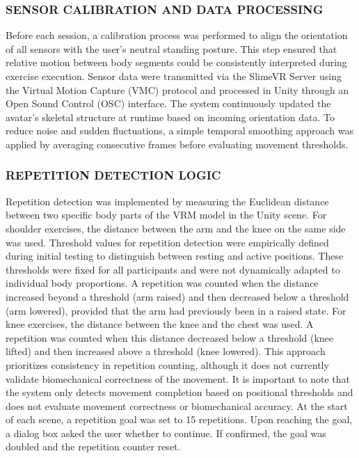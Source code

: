 \documentclass[a4paper,twoside]{article}
\begin{document}
\subsubsection{\uppercase{Sensor Calibration and Data Processing}}
Before each session, a calibration process was performed to align the orientation of all sensors with the user’s neutral standing posture. This step ensured that relative motion between body segments could be consistently interpreted during exercise execution.
Sensor data were transmitted via the SlimeVR Server using the Virtual Motion Capture (VMC) protocol and processed in Unity through an Open Sound Control (OSC) interface. The system continuously updated the avatar’s skeletal structure at runtime based on incoming orientation data.
To reduce noise and sudden fluctuations, a simple temporal smoothing approach was applied by averaging consecutive frames before evaluating movement thresholds.

\subsubsection{\uppercase{Repetition Detection Logic}}
Repetition detection was implemented by measuring the Euclidean distance between two specific body parts of the VRM model in the Unity scene. For shoulder exercises, the distance between the arm and the knee on the same side was used. Threshold values for repetition detection were empirically defined during initial testing to distinguish between resting and active positions. These thresholds were fixed for all participants and were not dynamically adapted to individual body proportions. A repetition was counted when the distance increased beyond a threshold (arm raised) and then decreased below a threshold (arm lowered), provided that the arm had previously been in a raised state. For knee exercises, the distance between the knee and the chest was used. A repetition was counted when this distance decreased below a threshold (knee lifted) and then increased above a threshold (knee lowered). 
This approach prioritizes consistency in repetition counting, although it does not currently validate biomechanical correctness of the movement.
 It is important to note that the system only detects movement completion based on positional thresholds and does not evaluate movement correctness or biomechanical accuracy. 
At the start of each scene, a repetition goal was set to 15 repetitions. Upon reaching the goal, a dialog box asked the user whether to continue. If confirmed, the goal was doubled and the repetition counter reset. 
\end{document}
